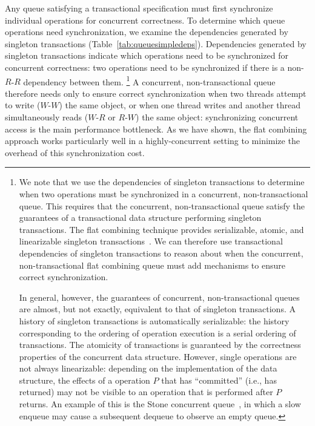 Any queue satisfying a transactional specification must first synchronize individual operations for concurrent correctness. To determine which queue operations need synchronization, we examine the dependencies generated by singleton transactions (Table~\ref{tab:queuesimpledeps}). Dependencies generated by singleton transactions indicate which operations need to be synchronized for concurrent correctness: two operations need to be synchronized if there is a non-$R$-$R$ dependency between them.%
\footnote{We note that we use the dependencies of singleton transactions to determine when two operations must be synchronized in a concurrent, non-transactional queue. This requires that the concurrent, non-transactional queue satisfy the guarantees of a transactional data structure performing singleton transactions.
The flat combining technique provides serializable, atomic, and linearizable singleton transactions~\cite{flatcombining}. We can therefore use transactional dependencies of singleton transactions to reason about when the concurrent, non-transactional flat combining queue must add mechanisms to ensure correct synchronization.

In general, however, the guarantees of concurrent, non-transactional queues are almost, but not exactly, equivalent to that of singleton transactions. A history of singleton transactions is automatically serializable: the history corresponding to the ordering of operation execution is a serial ordering of transactions. The atomicity of transactions is guaranteed by the correctness properties of the concurrent data structure. However, single operations are not always linearizable: depending on the implementation of the data structure, the effects of a operation $P$ that has ``committed'' (i.e., has returned) may not be visible to an operation that is performed after $P$ returns. An example of this is the Stone concurrent queue~\cite{stone}, in which a slow enqueue may cause a subsequent dequeue to observe an empty queue.}
A concurrent, non-transactional queue therefore needs only to ensure correct synchronization when two threads attempt to write ($W$-$W$) the same object, or when one thread writes and another thread simultaneously reads ($W$-$R$ or $R$-$W$) the same object: synchronizing concurrent access is the main performance bottleneck. As we have shown, the flat combining approach works particularly well in a highly-concurrent setting to minimize the overhead of this synchronization cost.

